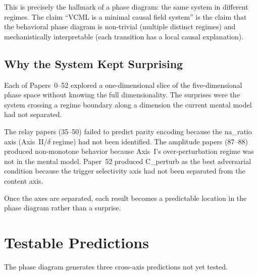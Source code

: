 \documentclass[11pt,a4paper]{article}
\begin{document}
This is precisely the hallmark of a phase diagram: the same system in different
regimes.
The claim ``VCML is a minimal causal field system'' is the claim that the
behavioral phase diagram is non-trivial (multiple distinct regimes) and
mechanistically interpretable (each transition has a local causal explanation).

\subsection{Why the System Kept Surprising}

Each of Papers~0--52 explored a one-dimensional slice of the five-dimensional
phase space without knowing the full dimensionality.
The surprises were the system crossing a regime boundary along a dimension the
current mental model had not separated.

The relay papers (35--50) failed to predict parity encoding because the
na\_ratio axis (Axis~II/$\delta$ regime) had not been identified.
The amplitude papers (87--88) produced non-monotone behavior because Axis~I's
over-perturbation regime was not in the mental model.
Paper~52 produced C\_perturb as the best adversarial condition because the
trigger selectivity axis had not been separated from the content axis.

Once the axes are separated, each result becomes a predictable location in
the phase diagram rather than a surprise.

\section{Testable Predictions}

The phase diagram generates three cross-axis predictions not yet tested.
\end{document}
